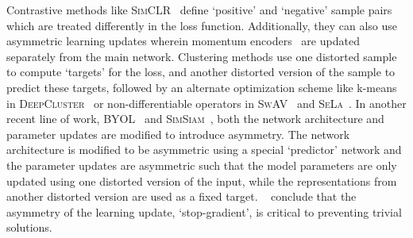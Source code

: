 Contrastive methods like \textsc{SimCLR}~\cite{chen2020simple} define `positive' and `negative' sample pairs which are treated differently in the loss function.
Additionally, they can also use asymmetric learning updates wherein momentum encoders~\cite{he2019momentum} are updated separately from the main network. 
Clustering methods use one distorted sample to compute `targets' for the loss, and another distorted version of the sample to predict these targets, followed by an alternate optimization scheme like k-means in \textsc{DeepCluster}~\cite{caron2018deep} or non-differentiable operators in \textsc{SwAV}~\cite{caron2020swav} and \textsc{SeLa}~\cite{asano2019self}.
In another recent line of work, \textsc{BYOL}~\cite{grill2020bootstrap} and \textsc{SimSiam}~\cite{chen2020exploring}, both the network architecture and parameter updates are modified to introduce asymmetry. The network architecture is modified to be asymmetric using a special `predictor' network and the parameter updates are asymmetric such that the model parameters are only updated using one distorted version of the input, while the representations from another distorted version are used as a fixed target.
~\cite{chen2020exploring} conclude that the asymmetry of the learning update, `stop-gradient', is critical to preventing trivial solutions.

